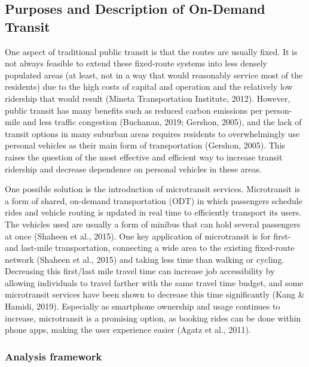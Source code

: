 \documentclass[
]{article}
\begin{document}
\hypertarget{purposes-and-description-of-on-demand-transit}{%
\subsection{Purposes and Description of On-Demand Transit}\label{purposes-and-description-of-on-demand-transit}}

One aspect of traditional public transit is that the routes are usually fixed. It is not always feasible to extend these fixed-route systems into less densely populated areas (at least, not in a way that would reasonably service most of the residents) due to the high costs of capital and operation and the relatively low ridership that would result (Mineta Transportation Institute, 2012). However, public transit has many benefits such as reduced carbon emissions per person-mile and less traffic congestion (Buchanan, 2019; Gershon, 2005), and the lack of transit options in many suburban areas requires residents to overwhelmingly use personal vehicles as their main form of transportation (Gershon, 2005). This raises the question of the most effective and efficient way to increase transit ridership and decrease dependence on personal vehicles in these areas.

One possible solution is the introduction of microtransit services. Microtransit is a form of shared, on-demand transportation (ODT) in which passengers schedule rides and vehicle routing is updated in real time to efficiently transport its users. The vehicles used are usually a form of minibus that can hold several passengers at once (Shaheen et al., 2015). One key application of microtransit is for first- and last-mile transportation, connecting a wide area to the existing fixed-route network (Shaheen et al., 2015) and taking less time than walking or cycling. Decreasing this first/last mile travel time can increase job accessibility by allowing individuals to travel farther with the same travel time budget, and some microtransit services have been shown to decrease this time significantly (Kang \& Hamidi, 2019). Especially as smartphone ownership and usage continues to increase, microtransit is a promising option, as booking rides can be done within phone apps, making the user experience easier (Agatz et al., 2011).

\hypertarget{analysis-framework}{%
\subsubsection{Analysis framework}\label{analysis-framework}}
\end{document}
